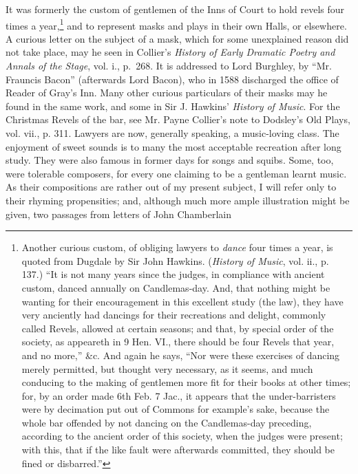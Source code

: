  \pagebreak%

It was formerly the custom of gentlemen of the Inns of Court to hold revels
four times a year,\footnote{\textit{}
Another curious custom, of obliging lawyers to \textit{dance}
four times a year, is quoted from Dugdale by Sir John
Hawkins. (\textit{History of Music}, vol. ii., p. 137.) “It is not
many years since the judges, in compliance with ancient
custom, danced annually on Candlemas-day. And, that
nothing might be wanting for their encouragement in this
excellent study (the law), they have very anciently had
dancings for their recreations and delight, commonly
called Revels, allowed at certain seasons; and that, by
special order of the society, as appeareth in 9 Hen. VI.,
there should be four Revels that year, and no more,” \&c.
And again he says, “Nor were these exercises of dancing
merely permitted, but thought very necessary, as it seems,
and much conducing to the making of gentlemen more fit
for their books at other times; for, by an order made 6th
Feb. 7 Jac., it appears that the under-barristers were by
decimation put out of Commons for example’s sake, because
the whole bar offended by not dancing on the
Candlemas-day preceding, according to the ancient order
of this society, when the judges were present; with this,
that if the like fault were afterwards committed, they
should be fined or disbarred.”}
 and to represent masks and plays in their own Halls, or elsewhere.
A curious letter on the subject of a mask, which for some unexplained
reason did not take place, may he seen in Collier’s \textit{History of Early Dramatic
Poetry and Annals of the Stage}, vol. i., p.~268. It is addressed to Lord
Burghley, by “Mr. Frauncis Bacon” (afterwards Lord Bacon), who in 1588 discharged
the office of Reader of Gray’s Inn. Many other curious particulars of
their masks may he found in the same work, and some in Sir J. Hawkins’ \textit{History
of Music}. For the Christmas Revels of the bar, see Mr. Payne Collier’s note to
Dodsley’s Old Plays, vol. vii., p. 311. Lawyers are now, generally speaking, a
music-loving class. The enjoyment of sweet sounds is to many the most acceptable
recreation after long study. They were also famous in former days for
songs and squibs. Some, too, were tolerable composers, for every one claiming to
be a gentleman learnt music. As their compositions are rather out of my present
subject, I will refer only to their rhyming propensities; and, although much more
ample illustration might be given, two passages from letters of John Chamberlain

